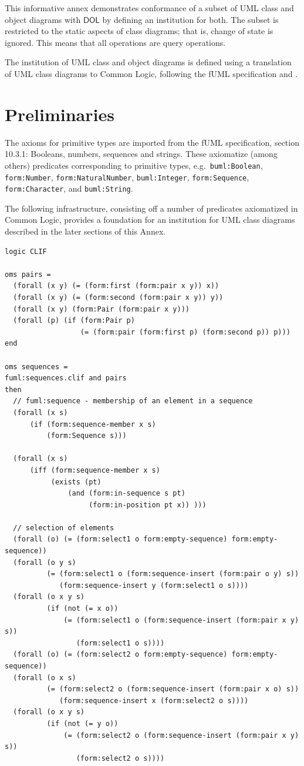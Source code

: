 \documentclass[10pt,fleqn,final]{scrreprt}
\newcommand{\cbs}[0]{\color{red}\xspace} %
\newcommand{\cbe}[0]{\color{black}\xspace} %
\newcommand*{\DOL}{\ensuremath{\mathsf{DOL}}\xspace}
\newenvironment{definitions}[0]{\medskip }{}
\begin{document}
\begin{definitions}
This informative annex demonstrates conformance of\cbs a subset of\cbe UML class and
object diagrams with \DOL by defining an institution for both. \cbs The subset is restricted to the\cbe
 static aspects of class diagrams; that is, change
of state is ignored. This means that all operations are query
operations.

The institution of UML class and object diagrams is defined using a
translation of UML class diagrams to Common Logic, following the fUML
specification and \cite{Seidewitz08}.

\section{Preliminaries}

\cbs The axioms for primitive types
are imported from the fUML specification, section 10.3.1:\cbe
Booleans, numbers, sequences and strings.  These
axiomatize (among others) predicates corresponding to primitive types,
e.g.\ \texttt{buml:Boolean}, \texttt{form:Number},
\texttt{form:NaturalNumber}, \texttt{buml:Integer},
\texttt{form:Sequence}, \texttt{form:Character}, and
\texttt{buml:String}.

\cbs
The following infrastructure, consisting off a number of predicates axiomatized in Common Logic,
provides a foundation for an institution for UML class diagrams described in the later sections of
this Annex. 
\cbe

\begin{lstlisting}[language=clif,morekeywords={then,with,logic,oms,end},mathescape]
logic CLIF

oms pairs =
  (forall (x y) (= (form:first (form:pair x y)) x))
  (forall (x y) (= (form:second (form:pair x y)) y))
  (forall (x y) (form:Pair (form:pair x y)))
  (forall (p) (if (form:Pair p)
                  (= (form:pair (form:first p) (form:second p)) p)))
end

oms sequences =
fuml:sequences.clif and pairs
then
  // fuml:sequence - membership of an element in a sequence
  (forall (x s)
      (if (form:sequence-member x s)
          (form:Sequence s)))

  (forall (x s)
      (iff (form:sequence-member x s)
           (exists (pt) 
               (and (form:in-sequence s pt)
                    (form:in-position pt x)) )))

  // selection of elements
  (forall (o) (= (form:select1 o form:empty-sequence) form:empty-sequence))
  (forall (o y s)
          (= (form:select1 o (form:sequence-insert (form:pair o y) s)) 
             (form:sequence-insert y (form:select1 o s))))
  (forall (o x y s)
          (if (not (= x o))
              (= (form:select1 o (form:sequence-insert (form:pair x y) s)) 
                 (form:select1 o s))))
  (forall (o) (= (form:select2 o form:empty-sequence) form:empty-sequence))
  (forall (o x s)
          (= (form:select2 o (form:sequence-insert (form:pair x o) s)) 
             (form:sequence-insert x (form:select2 o s))))
  (forall (o x y s)
          (if (not (= y o))
              (= (form:select2 o (form:sequence-insert (form:pair x y) s)) 
                 (form:select2 o s))))


\end{lstlisting}
\end{definitions}
\end{document}
